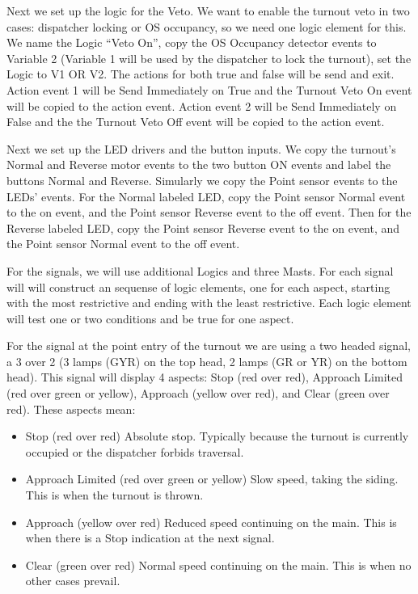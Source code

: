 \documentclass[12pt,twoside]{article}
\begin{document}
Next we set up the logic for the Veto. We want to enable the turnout veto in
two cases: dispatcher locking or OS occupancy, so we need one logic element
for this. We name the Logic ``Veto On'', copy the OS Occupancy detector events
to Variable 2 (Variable 1 will be used by the dispatcher to lock the turnout),
set the Logic to V1 OR V2. The actions for both true and false will be send
and exit. Action event 1 will be Send Immediately on True and the Turnout Veto
On event will be copied to the action event. Action event 2 will be Send
Immediately on False and the the Turnout Veto Off event will be copied to the
action event.

Next we set up the LED drivers and the button inputs. We copy the turnout's
Normal and Reverse motor events to the two button ON events and label the
buttons Normal and Reverse. Simularly we copy the Point sensor events to the
LEDs' events. For the Normal labeled LED, copy the Point sensor Normal event
to the on event, and the Point sensor Reverse event to the off event. Then for
the Reverse labeled LED, copy the Point sensor Reverse event to the on event, 
and the Point sensor Normal event to the off event.

For the signals, we will use additional Logics and three Masts.  For each 
signal will will construct an sequense of logic elements, one for each aspect, 
starting with the most restrictive and ending with the least restrictive.  
Each logic element will test one or two conditions and be true for one aspect.

For the signal at the point entry of the turnout we are using a two headed
signal, a 3 over 2 (3 lamps (GYR) on the top head, 2 lamps (GR or YR) on the
bottom head). This signal will display 4 aspects: Stop (red over red),
Approach Limited (red over green or yellow), Approach (yellow over red), and 
Clear (green over red).  These aspects mean: 

\begin{itemize}
\item Stop (red over red) Absolute stop.  Typically because the turnout is 
currently occupied or the dispatcher forbids traversal.
\item Approach Limited (red over green or yellow) Slow speed, taking the 
siding.  This is when the turnout is thrown.
\item Approach (yellow over red) Reduced speed continuing on the main.  This 
is when there is a Stop indication at the next signal.
\item  Clear (green over red) Normal speed continuing on the main.  This is 
when no other cases prevail.
\end{itemize}
\end{document}

